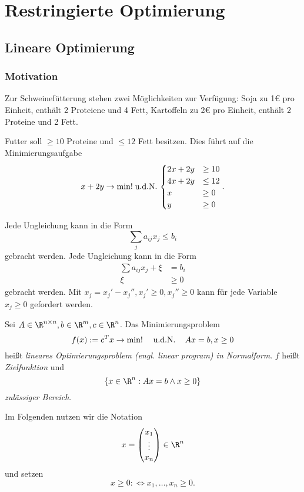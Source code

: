 \chapter{Restringierte Optimierung}



\section{Lineare Optimierung}


\subsection{Motivation}

Zur Schweinefütterung stehen zwei Möglichkeiten zur Verfügung:
Soja zu 1€ pro Einheit, enthält 2 Proteiene und 4 Fett, Kartoffeln zu 2€ pro Einheit, enthält 2 Proteine und 2 Fett.

Futter soll $\ge 10$ Proteine und $\le 12$ Fett besitzen.
Dies führt auf die Minimierungsaufgabe
\[
	x + 2y \to \min!
	\;\text{u.d.N.}\,
	\begin{cases}
		2x + 2y &\ge 10 \\
		4x + 2y &\le 12 \\
		x &\ge 0 \\
		y &\ge 0
	\end{cases}.
\]


Jede Ungleichung kann in die Form
\[
	\sum_{j} a_{ij} x_j \le b_i
\]
gebracht werden.
Jede Ungleichung kann in die Form
\begin{align*}
	\sum a_{ij} x_j + \xi &= b_i \\
	\xi &\ge 0
\end{align*}
gebracht werden.
Mit $x_j = x_j' - x_j'', x_j' \ge 0, x_j'' \ge 0$
kann für jede Variable $x_j \ge 0$ gefordert werden.

\begin{df} \label{3.1}
	Sei $A \in \R^{n\times n}, b\in \R^m, c \in \R^n$.
	Das Minimierungsproblem
	\[
		f(x) := c^T x \to \min!
		\quad\;\text{u.d.N.}\,\quad
		Ax = b, x \ge 0
	\]
	heißt \emph{lineares Optimierungsproblem (engl. linear program) in Normalform}.
	$f$ heißt \emph{Zielfunktion} und
	\[
		\{x \in \R^n : Ax = b \land x \ge 0 \}
	\]
	\emph{zulässiger Bereich}.
\end{df}

\begin{conv*}
	Im Folgenden nutzen wir die Notation
	\[
		x = \begin{pmatrix}
			x_1 \\ \vdots \\ x_n
		\end{pmatrix} \in \R^n
	\]
	und setzen
	\[
		x \ge 0
		:\iff
		x_1, \dotsc, x_n \ge 0.
	\]
\end{conv*}

